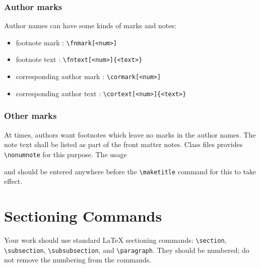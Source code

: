 \documentclass[
]{ceurart}
\begin{document}
\subsubsection{Author marks}

Author names can have some kinds of marks and notes:
\begin{itemize}
\item footnote mark : \verb|\fnmark[<num>]|
\item footnote text : \verb|\fntext[<num>]{<text>}|
\item corresponding author mark : \verb|\cormark[<num>]|
\item corresponding author text : \verb|\cortext[<num>]{<text>}|
\end{itemize}

\subsubsection{Other marks}

At times, authors want footnotes which leave no marks in
the author names. The note text shall be listed as part of
the front matter notes. Class files provides
\verb|\nonumnote| for this purpose. The usage

and should be entered anywhere before the \verb|\maketitle|
command for this to take effect. 

\section{Sectioning Commands}

Your work should use standard \LaTeX{} sectioning commands:
\verb|\section|, \verb|\subsection|,
\verb|\subsubsection|, and
\verb|\paragraph|. They should be numbered; do not remove
the numbering from the commands.
\end{document}
